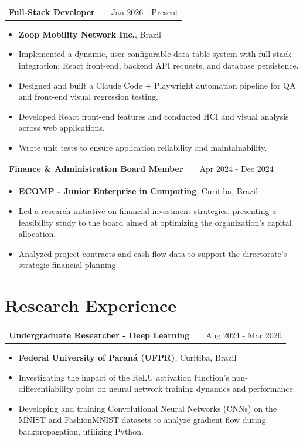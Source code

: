 \documentclass[a4paper,12pt]{article}
\makeatletter
\newenvironment{joblong}[2]
    {
    \begin{tabularx}{\linewidth}{@{}l X r@{}}
    \textbf{#1} & \hfill &  #2 \\[3.75pt]
    \end{tabularx}
    \begin{minipage}[t]{\linewidth}
    \begin{itemize}[nosep,after=\strut, leftmargin=1em, itemsep=3pt,label=--]
    }
    {
    \end{itemize}
    \end{minipage}    
    }
\makeatother
\begin{document}
\begin{joblong}{Full-Stack Developer}{Jan 2026 - Present}
\item \textbf{Zoop Mobility Network Inc.}, Brazil
\item Implemented a dynamic, user-configurable data table system with full-stack integration: React front-end, backend API requests, and database persistence.
\item Designed and built a Claude Code + Playwright automation pipeline for QA and front-end visual regression testing.
\item Developed React front-end features and conducted HCI and visual analysis across web applications.
\item Wrote unit tests to ensure application reliability and maintainability.
\end{joblong}

\begin{joblong}{Finance \& Administration Board Member}{Apr 2024 - Dec 2024}
\item \textbf{ECOMP - Junior Enterprise in Computing}, Curitiba, Brazil
\item Led a research initiative on financial investment strategies, presenting a feasibility study to the board aimed at optimizing the organization's capital allocation.
\item Analyzed project contracts and cash flow data to support the directorate's strategic financial planning.
\end{joblong}

\section{Research Experience}

\begin{joblong}{Undergraduate Researcher - Deep Learning}{Aug 2024 - Mar 2026}
\item \textbf{Federal University of Paraná (UFPR)}, Curitiba, Brazil
\item Investigating the impact of the ReLU activation function's non-differentiability point on neural network training dynamics and performance.
\item Developing and training Convolutional Neural Networks (CNNs) on the MNIST and FashionMNIST datasets to analyze gradient flow during backpropagation, utilizing Python.
\end{joblong}

\end{document}
